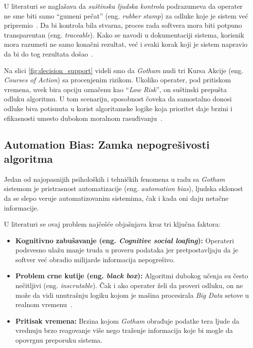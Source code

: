 ﻿\documentclass[12pt]{article}
\begin{document}
U literaturi se naglašava da \textit{suštinska ljudska kontrola} podrazumeva da operater ne sme biti samo \enquote{gumeni pečat} (eng. \textit{rubber stamp}) za odluke koje je sistem već pripremio~\cite{ethical2025reconnaissance}.
Da bi kontrola bila stvarna, proces rada softvera mora biti potpuno transparentan (eng. \textit{traceable}). Kako se navodi u dokumentaciji sistema, korisnik mora razumeti ne samo konačni rezultat, već i svaki korak koji je sistem napravio da bi do tog rezultata došao~\cite{architecture2024}.

Na slici \ref{fig:decision_support} videli smo da \textit{Gotham} nudi tri Kursa Akcije (eng. \textit{Courses of Action}) sa procenjenim rizikom.
Ukoliko operater, pod pritiskom vremena, uvek bira opciju označenu kao \enquote{\textit{Low Risk}}, on suštinski prepušta odluku algoritmu.
U tom scenariju, sposobnost čoveka da samostalno donosi odluke biva potisnuta u korist algoritamske logike koja prioritet daje brzini i efikasnosti umesto dubokom moralnom rasuđivanju~\cite{tilbury2024automation, woodcock2024human}.

\subsection{Automation Bias: Zamka nepogrešivosti algoritma}

Jedan od najopasnijih psiholoških i tehničkih fenomena u radu sa \textit{Gotham} sistemom je pristrasnost automatizacije (eng. \textit{automation bias}), ljudska sklonost da se slepo veruje automatizovanim sistemima, čak i kada oni daju netačne informacije.

U literaturi se ovaj problem najčešće objašnjava kroz tri ključna faktora:
\begin{itemize}
    \item \textbf{Kognitivno zabušavanje (eng. \textit{Cognitive social loafing}):} Operateri podsvesno ulažu manje truda u proveru podataka jer pretpostavljaju da je softver već obradio milijarde informacija nepogrešivo.
    \item \textbf{Problem crne kutije (eng. \textit{black box}):} Algoritmi dubokog učenja su često nečitljivi (eng. \textit{inscrutable}).
    Čak i ako operater želi da proveri odluku, on ne može da vidi unutrašnju logiku kojom je mašina procesirala \textit{Big Data} setove u realnom vremenu~\cite{woodcock2024human}.
    \item \textbf{Pritisak vremena:} Brzina kojom \textit{Gotham} obrađuje podatke tera ljude da vrednuju brzo reagovanje više nego traženje informacija koje bi mogle da opovrgnu preporuku sistema.
\end{itemize}
\end{document}
